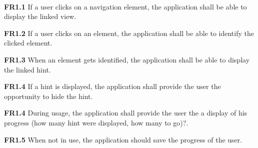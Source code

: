 \paragraph{}
\begin{closeItem}
    \item [\textbf{FR1.1}] If a user clicks on a navigation element, the application shall be able to display the linked view.
    \item [\textbf{FR1.2}] If a user clicks on an element, the application shall be able to identify the clicked element.
    \item [\textbf{FR1.3}] When an element gets identified, the application shall be able to display the linked hint.
    \item [\textbf{FR1.4}] If a hint is displayed, the application shall provide the user the opportunity to hide the hint.
    \item [\textbf{FR1.4}] During usage, the application shall provide the user the a display of his progress (how many hint were displayed, how many to go)?.
    \item [\textbf{FR1.5}] When not in use, the application should save the progress of the user.
\end{closeItem}

